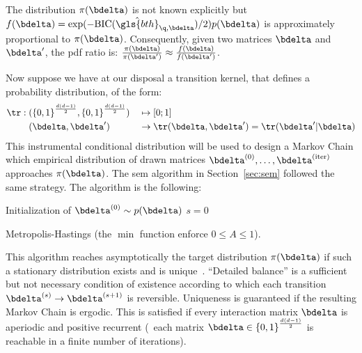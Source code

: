 The distribution $\pi(\bdelta)$ is not known explicitly but $f(\bdelta) = \exp(-\text{BIC}(\hat{\gls{bth}}_{\q,\bdelta})/2) p(\bdelta)$ is approximately proportional to $\pi(\bdelta)$. Consequently, given two matrices $\bdelta$ and $\bdelta'$, the \gls{pdf} ratio is: $\frac{\pi(\bdelta)}{\pi(\bdelta')} \approx \frac{f(\bdelta)}{f(\bdelta')}$.

Now suppose we have at our disposal a transition kernel, that defines a probability distribution, of the form:
\begin{alignat}{2}
\tr: \; & ({\{0,1\}}^{\frac{d(d-1)}{2}},{\{0,1\}}^{\frac{d(d-1)}{2}}) && \mapsto [0;1] \nonumber \\ 
& (\bdelta,\bdelta') && \to \tr(\bdelta,\bdelta') = \tr(\bdelta' | \bdelta) \nonumber
\end{alignat}
This instrumental conditional distribution will be used to design a Markov Chain which empirical distribution of drawn matrices $\bdelta^{(0)}, \dots, \bdelta^{(\text{iter})}$ approaches $\pi(\bdelta)$. The \gls{sem} algorithm in Section~\ref{sec:sem} followed the same strategy. The algorithm is the following:

\begin{algorithm}[H]
 Initialization of $ \bdelta^{(0)} \sim p(\bdelta)$\;
 $s = 0$\;
\caption{\label{metropolis} Metropolis-Hastings (the $\min$ function enforce $0 \leq A \leq 1$).}
\label{alg:metro}
\end{algorithm}

This algorithm reaches asymptotically the target distribution $\pi(\bdelta)$ if such a stationary distribution exists and is unique~\cite{meyn2012markov}. ``Detailed balance'' is a sufficient but not necessary condition of existence according to which each transition $\bdelta^{(s)} \rightarrow \bdelta^{(s+1)}$ is reversible. Uniqueness is guaranteed if the resulting Markov Chain is ergodic. This is satisfied if every interaction matrix $\bdelta$ is aperiodic and positive recurrent (\ each matrix $\bdelta \in {\{0,1\}}^{\frac{d(d-1)}{2}}$ is reachable in a finite number of iterations). 

